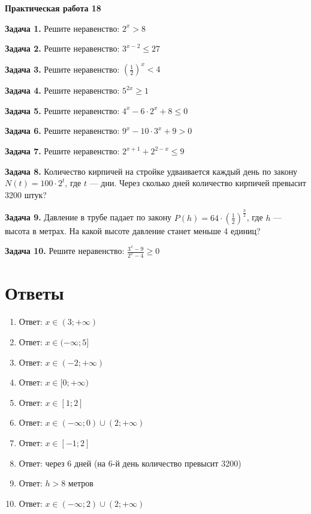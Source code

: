 \documentclass{umk-matematika}
\begin{document}
\begin{center}
{\Large\bfseries Практическая работа 18}
\end{center}
\vspace{0.5cm}

\textbf{Задача 1.} Решите неравенство: $2^x > 8$\par\vspace{10pt}
\textbf{Задача 2.} Решите неравенство: $3^{x-2} \le 27$\par\vspace{10pt}
\textbf{Задача 3.} Решите неравенство: $\left(\frac{1}{2}\right)^x < 4$\par\vspace{10pt}
\textbf{Задача 4.} Решите неравенство: $5^{2x} \ge 1$\par\vspace{10pt}
\textbf{Задача 5.} Решите неравенство: $4^{x} - 6 \cdot 2^{x} + 8 \le 0$\par\vspace{10pt}
\textbf{Задача 6.} Решите неравенство: $9^{x} - 10 \cdot 3^{x} + 9 > 0$\par\vspace{10pt}
\textbf{Задача 7.} Решите неравенство: $2^{x+1} + 2^{2-x} \le 9$\par\vspace{10pt}
\textbf{Задача 8.} Количество кирпичей на стройке удваивается каждый день по закону $N(t) = 100 \cdot 2^{t}$, где $t$ — дни. Через сколько дней количество кирпичей превысит 3200 штук?\par\vspace{10pt}
\textbf{Задача 9.} Давление в трубе падает по закону $P(h) = 64 \cdot \left(\frac{1}{2}\right)^{\frac{h}{2}}$, где $h$ — высота в метрах. На какой высоте давление станет меньше 4 единиц?\par\vspace{10pt}
\textbf{Задача 10.} Решите неравенство: $\frac{3^{x} - 9}{2^{x} - 4} \ge 0$\par\vspace{10pt}
\newpage
\section*{Ответы}

\begin{enumerate}
  \item Ответ: $x \in (3; +\infty)$
  \item Ответ: $x \in (-\infty; 5]$
  \item Ответ: $x \in (-2; +\infty)$
  \item Ответ: $x \in [0; +\infty)$
  \item Ответ: $x \in [1; 2]$
  \item Ответ: $x \in (-\infty; 0) \cup (2; +\infty)$
  \item Ответ: $x \in [-1; 2]$
  \item Ответ: через $6$ дней (на 6-й день количество превысит 3200)
  \item Ответ: $h > 8$ метров
  \item Ответ: $x \in (-\infty; 2) \cup (2; +\infty)$
\end{enumerate}
\end{document}
